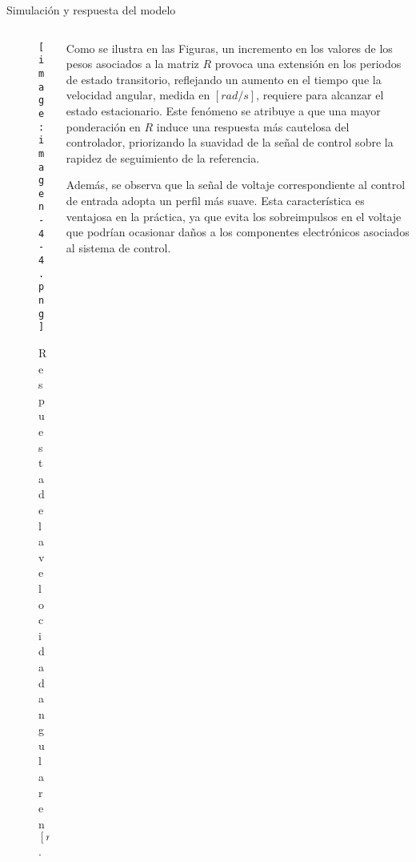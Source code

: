 \documentclass{beamer}
\begin{document}
\begin{frame}{Simulación y respuesta del modelo}
    \begin{columns}
        \begin{column}{0.45\textwidth}
            \begin{figure}
                \centering
                \texttt{[image: imagen-4-4.png]}
                \caption{Respuesta de la velocidad angular en $[rad/seg]$.}
                \label{fig:practico-1}
            \end{figure}
        \end{column}
        
        \begin{column}{0.5\textwidth}
            \scriptsize
            \begin{justify}
                Como se ilustra en las Figuras,  un incremento en los valores de los pesos asociados a la matriz \( R \) provoca una extensión en los periodos de estado transitorio, reflejando un aumento en el tiempo que la velocidad angular, medida en \([rad/s]\), requiere para alcanzar el estado estacionario. Este fenómeno se atribuye a que una mayor ponderación en \( R \) induce una respuesta más cautelosa del controlador, priorizando la suavidad de la señal de control sobre la rapidez de seguimiento de la referencia.

                Además, se observa que la señal de voltaje correspondiente al control de entrada adopta un perfil más suave. Esta característica es ventajosa en la práctica, ya que evita los sobreimpulsos en el voltaje que podrían ocasionar daños a los componentes electrónicos asociados al sistema de control.
            \end{justify}
        \end{column}
    \end{columns}
\end{frame}
\end{document}
